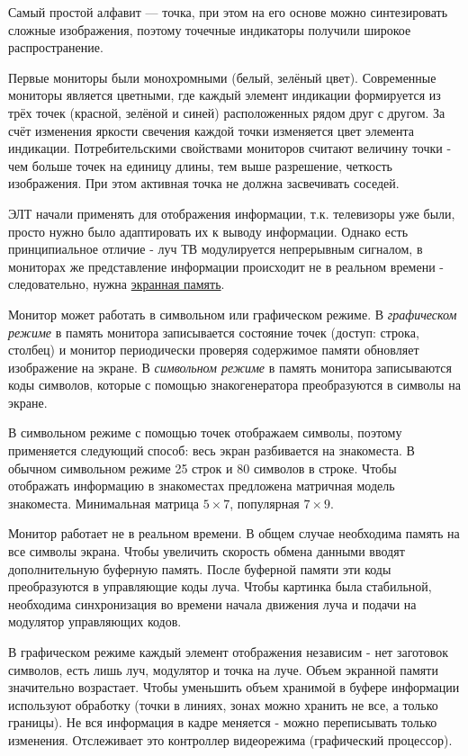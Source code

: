 \documentclass[unicode, 12pt, a4paper, oneside]{article}
\begin{document}
Самый простой алфавит --- точка, при этом на его основе можно синтезировать сложные изображения, поэтому точечные индикаторы получили широкое распространение. 

Первые мониторы были монохромными (белый, зелёный цвет). Современные мониторы является цветными, где каждый элемент индикации формируется из трёх точек (красной, зелёной и синей) расположенных рядом друг с другом. За счёт изменения яркости свечения каждой точки изменяется цвет элемента индикации. Потребительскими свойствами мониторов считают величину точки - чем больше точек на единицу длины, тем выше разрешение, четкость изображения. При этом активная точка не должна засвечивать соседей.

ЭЛТ начали применять для отображения информации, т.к. телевизоры уже были, просто нужно было адаптировать их к выводу информации. Однако есть принципиальное отличие - луч ТВ модулируется непрерывным сигналом, в мониторах же представление информации происходит не в реальном времени - следовательно, нужна \underline{экранная память}.

Монитор может работать в символьном или графическом режиме. В \textit{графическом режиме} в память монитора записывается состояние точек (доступ: строка, столбец) и монитор периодически проверяя содержимое памяти обновляет изображение на экране. В \textit{символьном режиме} в память монитора записываются коды символов, которые с помощью знакогенератора преобразуются в символы на экране.

В символьном режиме с помощью точек отображаем символы, поэтому применяется следующий способ: весь экран разбивается на знакоместа. В обычном символьном режиме 25 строк и 80 символов в строке. Чтобы отображать информацию в знакоместах предложена матричная модель знакоместа. Минимальная матрица $5 \times 7$, популярная $7 \times 9$.

Монитор работает не в реальном времени. В общем случае необходима память на все символы экрана. Чтобы увеличить скорость обмена данными вводят дополнительную буферную память. После буферной памяти эти коды преобразуются в управляющие коды луча. Чтобы картинка была стабильной, необходима синхронизация во времени начала движения луча и подачи на модулятор управляющих кодов.

В графическом режиме каждый элемент отображения независим - нет заготовок символов, есть лишь луч, модулятор и точка на луче. Объем экранной памяти значительно возрастает. Чтобы уменьшить объем хранимой в буфере информации используют обработку (точки в линиях, зонах можно хранить не все, а только границы). Не вся информация в кадре меняется - можно переписывать только изменения. Отслеживает это контроллер видеорежима (графический процессор).
\end{document}
